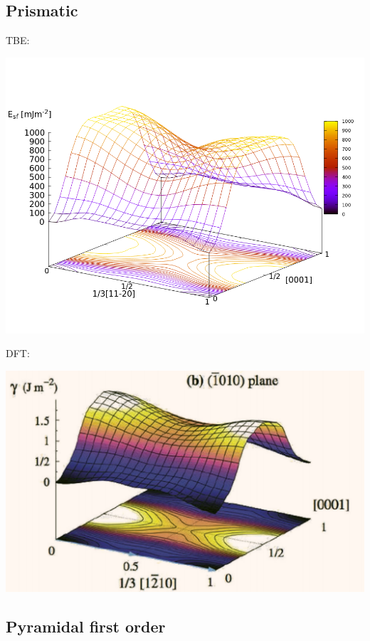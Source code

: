 \documentclass[11pt]{article}
\begin{document}
\subsection{Prismatic}
\label{sec:orged5d77a}

TBE:
\begin{center}
\includegraphics[width=.9\linewidth]{Images/prismatic_gamma_surface_final_model_angle_smaller.png}
\end{center}

DFT:
\begin{center}
\includegraphics[width=.9\linewidth]{Images/rodney_prismatic_ti_gamma_surface.png}
\end{center}

\subsection{Pyramidal first order}
\label{sec:org5a80c3e}
\end{document}
